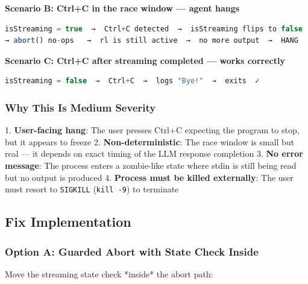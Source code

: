 \textbf{Scenario B: Ctrl+C in the race window — agent hangs}



\begin{lstlisting}[language=TypeScript]
isStreaming = true  →  Ctrl+C detected  →  isStreaming flips to false
→ abort() no-ops   →  rl is still active  →  no more output  →  HANG

\end{lstlisting}



\textbf{Scenario C: Ctrl+C after streaming completed — works correctly}



\begin{lstlisting}[language=TypeScript]
isStreaming = false  →  Ctrl+C  →  logs "Bye!"  →  exits  ✓

\end{lstlisting}



\subsubsection*{Why This Is Medium Severity}

1. \textbf{User-facing hang}: The user presses Ctrl+C expecting the program to stop, but it appears to freeze
2. \textbf{Non-deterministic}: The race window is small but real — it depends on exact timing of the LLM response completion
3. \textbf{No error message}: The process enters a zombie-like state where stdin is still being read but no output is produced
4. \textbf{Process must be killed externally}: The user must resort to \texttt{SIGKILL} (\texttt{kill -9}) to terminate


\subsection*{Fix Implementation}
\subsubsection*{Option A: Guarded Abort with State Check Inside}

Move the streaming state check *inside* the abort path:



